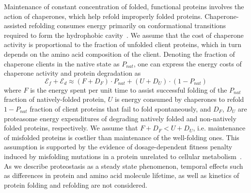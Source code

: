 \documentclass[10pt,letterpaper]{article}
\begin{document}
Maintenance of constant concentration of folded, functional proteins involves the action of chaperones, which help refold improperly folded proteins. Chaperone-assisted refolding consumes energy primarily on conformational transitions required to form the hydrophobic cavity~\cite{Hartl2011Molecular}. We assume that the cost of chaperone activity is proportional to the fraction of unfolded client proteins, which in turn depends on the amino acid composition of the client. Denoting the fraction of chaperone clients in the native state as $P_{nat}$, one can express the energy costs of chaperone activity and protein degradation as 
\begin{equation}
	\label{chaperone_degradation_cost}
	\mathcal{E}_{f} + \mathcal{E}_{d} \approx (F+D_{F})\cdot P_{nat} + (U+D_{U})\cdot\left(1-P_{nat}\right)
\end{equation}
where $F$ is the energy spent per unit time to assist successful folding of the $P_{nat}$ fraction of natively-folded protein, $U$ is energy consumed by chaperones to refold $1-P_{nat}$ fraction of client proteins that fail to fold spontaneously, and $D_F$, $D_U$ are proteasome energy expenditures of degrading natively folded and non-natively folded proteins, respectively. We assume that $F+D_{F}<U+D_{U}$, i.e. maintenance of misfolded proteins is costlier than maintenance of the well-folding ones. This assumption is supported by the evidence of dosage-dependent fitness penalty induced by misfolding mutations in a protein unrelated to cellular metabolism~\cite{Samerotte2011Misfolded}. As we describe proteostasis as a steady state phenomenon, temporal effects such as differences in protein and amino acid molecule lifetime, as well as kinetics of protein folding and refolding are not considered.
\end{document}
